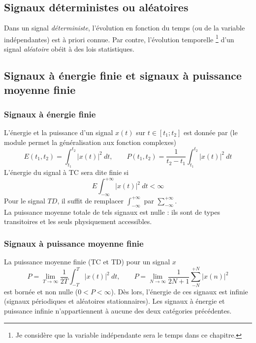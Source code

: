 	\subsection{Signaux déterministes ou aléatoires}
	Dans un signal \textit{déterministe}, l'évolution en fonction du temps (ou de la 
	variable indépendantes) est à priori connue. Par contre, l'évolution temporelle
	\footnote{Je considère que la variable indépendante sera le temps dans ce chapitre.} 
	d'un signal \textit{aléatoire} obéit à des lois statistiques.
	
	\subsection{Signaux à énergie finie et signaux à puissance moyenne finie}
	\subsubsection{Signaux à énergie finie}
	L'énergie et la puissance d'un signal $x(t)$ sur $t \in [t_1;t_2]$ est donnée par 
	(le module permet la généralisation aux fonction complexes)
	\begin{equation}
	E(t_1,t_2) = \int_{t_1}^{t_2} |x(t)|^2\ dt,\qquad
	P(t_1,t_2) = \dfrac{1}{t_2-t_1}\int_{t_1}^{t_2} |x(t)|^2\ dt
	\end{equation}
	L'énergie du signal à TC sera dite finie si
	\begin{equation}
	E \int_{-\infty}^{+\infty} |x(t)|^2\ dt < \infty
	\end{equation}
	Pour le signal $TD$, il suffit de remplacer $\int_{-\infty}^{+\infty}$ par 
	$\sum_{-\infty}^{+\infty}$.\\
	La puissance moyenne totale de tels signaux est nulle : ils sont de types 
	transitoires et les seuls physiquement accessibles.
	
	\subsubsection{Signaux à puissance moyenne finie}
	La puissance moyenne finie (TC et TD) pour un signal $x$
	\begin{equation}
	P = \lim\limits_{T\rightarrow\infty} \dfrac{1}{2T}\int_{-T}^T |x(t)|^2\ dt,\qquad
	P = \lim\limits_{N\rightarrow\infty} \dfrac{1}{2N+1}\sum_{-N}^{+N} |x(n)|^2
	\end{equation}
	est bornée et non nulle ($0<P<\infty$). Dès lors, l'énergie de ces signaux est 
	infinie (signaux périodiques et aléatoires stationnaires). Les signaux à énergie 
	et puissance infinie n'appartiennent à aucune des deux catégories précédentes.
	

